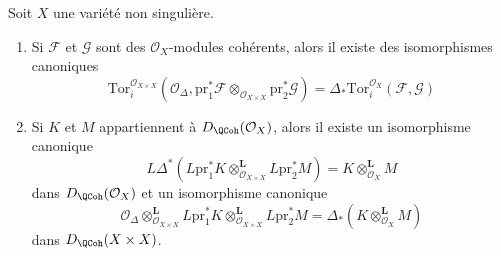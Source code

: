 \begin{lemma}
\label{lemma-tor-and-diagonal}
Soit $X$ une variété non singulière.
\begin{enumerate}
\item Si $\mathcal{F}$ et $\mathcal{G}$ sont des $\mathcal{O}_X$-modules cohérents,
alors il existe des isomorphismes canoniques
$$
\text{Tor}_i^{\mathcal{O}_{X \times X}}(\mathcal{O}_\Delta,
\text{pr}_1^*\mathcal{F} \otimes_{\mathcal{O}_{X \times X}}
\text{pr}_2^*\mathcal{G})
=
\Delta_*\text{Tor}_i^{\mathcal{O}_X}(\mathcal{F}, \mathcal{G})
$$
\item Si $K$ et $M$ appartiennent à $D_\QCoh(\mathcal{O}_X)$, alors
il existe un isomorphisme canonique
$$
L\Delta^* \left(
L\text{pr}_1^*K \otimes_{\mathcal{O}_{X \times X}}^\mathbf{L} L\text{pr}_2^*M
\right)
= K \otimes_{\mathcal{O}_X}^\mathbf{L} M
$$
dans $D_\QCoh(\mathcal{O}_X)$ et un isomorphisme canonique
$$
\mathcal{O}_\Delta \otimes_{\mathcal{O}_{X \times X}}^\mathbf{L}
L\text{pr}_1^*K \otimes_{\mathcal{O}_{X \times X}}^\mathbf{L} L\text{pr}_2^*M
= \Delta_*(K \otimes_{\mathcal{O}_X}^\mathbf{L} M)
$$
dans $D_\QCoh(X \times X)$.
\end{enumerate}
\end{lemma}

